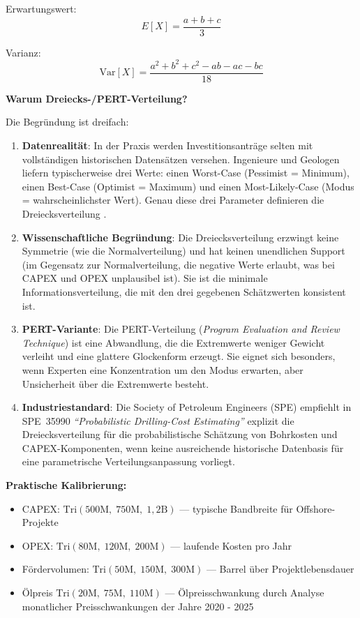 \documentclass[11pt,a4paper]{article}
\begin{document}
Erwartungswert:
\begin{equation}
E[X] = \frac{a + b + c}{3}
\end{equation}

Varianz:
\begin{equation}
\text{Var}[X] = \frac{a^2 + b^2 + c^2 - ab - ac - bc}{18}
\end{equation}

\textbf{Warum Dreiecks-/PERT-Verteilung?}

Die Begründung ist dreifach:

\begin{enumerate}[label=\arabic*., itemsep=4pt]
  \item \textbf{Datenrealität}: In der Praxis werden Investitionsanträge selten mit vollständigen historischen Datensätzen versehen. Ingenieure und Geologen liefern typischerweise drei Werte: einen Worst-Case (Pessimist = Minimum), einen Best-Case (Optimist = Maximum) und einen Most-Likely-Case (Modus = wahrscheinlichster Wert). Genau diese drei Parameter definieren die Dreiecksverteilung \cite{newendorp2000}.
  \item \textbf{Wissenschaftliche Begründung}: Die Dreiecksverteilung erzwingt keine Symmetrie (wie die Normalverteilung) und hat keinen unendlichen Support (im Gegensatz zur Normalverteilung, die negative Werte erlaubt, was bei CAPEX und OPEX unplausibel ist). Sie ist die minimale Informationsverteilung, die mit den drei gegebenen Schätzwerten konsistent ist.
  \item \textbf{PERT-Variante}: Die PERT-Verteilung (\textit{Program Evaluation and Review Technique}) ist eine Abwandlung, die die Extremwerte weniger Gewicht verleiht und eine glattere Glockenform erzeugt. Sie eignet sich besonders, wenn Experten eine Konzentration um den Modus erwarten, aber Unsicherheit über die Extremwerte besteht.
  \item \textbf{Industriestandard}: Die Society of Petroleum Engineers (SPE) empfiehlt in SPE~35990 \textit{``Probabilistic Drilling-Cost Estimating''} \cite{spe35990} explizit die Dreiecksverteilung für die probabilistische Schätzung von Bohrkosten und CAPEX-Komponenten, wenn keine ausreichende historische Datenbasis für eine parametrische Verteilungsanpassung vorliegt.
\end{enumerate}

\textbf{Praktische Kalibrierung:}
\begin{itemize}[itemsep=1pt]
  \item CAPEX: $\text{Tri}(500\text{M},\; 750\text{M},\; 1{,}2\text{B})$ — typische Bandbreite für Offshore-Projekte
  \item OPEX: $\text{Tri}(80\text{M},\; 120\text{M},\; 200\text{M})$ — laufende Kosten pro Jahr
  \item Fördervolumen: $\text{Tri}(50\text{M},\; 150\text{M},\; 300\text{M})$ — Barrel über Projektlebensdauer
   \item Ölpreis $\text{Tri}(20\text{M},\; 75\text{M},\; 110\text{M})$ — Ölpreisschwankung durch Analyse monatlicher Preisschwankungen der Jahre 2020 - 2025 \cite{opec2026}
\end{itemize}
\end{document}
